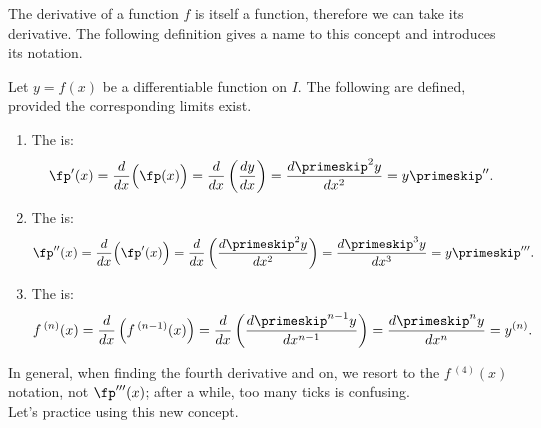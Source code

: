 The derivative of a function $f$ is itself a function, therefore we can take its derivative. The following definition gives a name to this concept and introduces its notation.
\enlargethispage{2\baselineskip}
{}
{Let $y=f(x)$ be a differentiable function on $I$. The following are defined, provided the corresponding limits exist. 
		\begin{enumerate}
		\item		The  is: 
						$$ \fp'(x) = \frac{d}{dx}\Big(\fp(x)\Big) = \frac{d}{dx}\left(\frac{dy}{dx}\right) = \frac{d\primeskip^2y}{dx^2}=y\primeskip''.$$
				\item		The  is: 
						$$ \fp''(x) = \frac{d}{dx}\Big(\fp'(x)\Big) = \frac{d}{dx}\left(\frac{d\primeskip^2y}{dx^2}\right) = \frac{d\primeskip^3y}{dx^3}=y\primeskip'''.$$
				\item		The  is:
						$$ f\,^{(n)}(x) = \frac{d}{dx}\left(f\,^{(n-1)}(x)\right) = \frac{d}{dx}\left(\frac{d\primeskip^{n-1}y}{dx^{n-1}}\right) = \frac{d\primeskip^ny}{dx^n}=y^{(n)}.$$
		\end{enumerate}
}
\normalsize

In general, when finding the fourth derivative and on, we resort to the $f\,^{(4)}(x)$ notation, not $\fp'''(x)$; after a while, too many ticks is  confusing.\\

Let's practice using this new concept.\\

